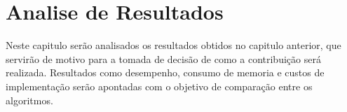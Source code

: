 
\chapter{Analise de Resultados} %
\label{cha:analise_de_resultados}

Neste capitulo serão analisados os resultados obtidos no capitulo anterior, que servirão de motivo para a tomada de decisão de como a contribuição será realizada. Resultados como desempenho, consumo de memoria e custos de implementação serão apontadas com o objetivo de comparação entre os algoritmos.






